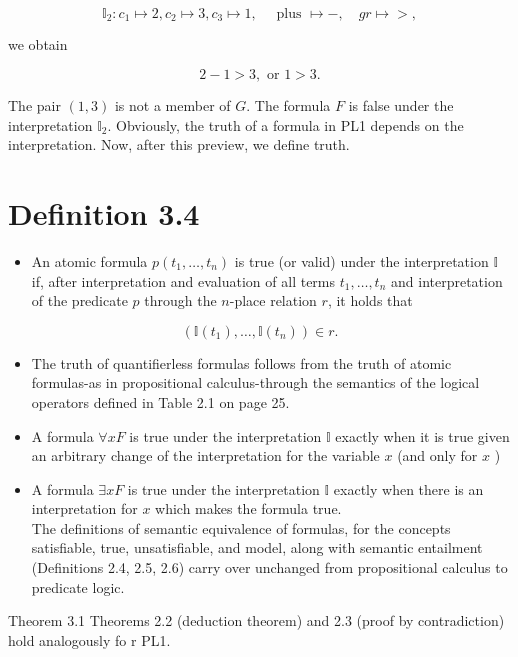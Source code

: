 \documentclass[10pt]{article}
\begin{document}
$$
\mathbb{I}_{2}: c_{1} \mapsto 2, c_{2} \mapsto 3, c_{3} \mapsto 1, \quad \text { plus } \mapsto-, \quad g r \mapsto>,
$$

we obtain

$$
2-1>3, \text { or } 1>3 .
$$

The pair $(1,3)$ is not a member of $G$. The formula $F$ is false under the interpretation $\mathbb{I}_{2}$. Obviously, the truth of a formula in PL1 depends on the interpretation. Now, after this preview, we define truth.

\section*{Definition 3.4}
\begin{itemize}
  \item An atomic formula $p\left(t_{1}, \ldots, t_{n}\right)$ is true (or valid) under the interpretation $\mathbb{I}$ if, after interpretation and evaluation of all terms $t_{1}, \ldots, t_{n}$ and interpretation of the predicate $p$ through the $n$-place relation $r$, it holds that
\end{itemize}

$$
\left(\mathbb{I}\left(t_{1}\right), \ldots, \mathbb{I}\left(t_{n}\right)\right) \in r .
$$

\begin{itemize}
  \item The truth of quantifierless formulas follows from the truth of atomic formulas-as in propositional calculus-through the semantics of the logical operators defined in Table 2.1 on page 25.
  \item A formula $\forall x F$ is true under the interpretation $\mathbb{I}$ exactly when it is true given an arbitrary change of the interpretation for the variable $x$ (and only for $x$ )
  \item A formula $\exists x F$ is true under the interpretation $\mathbb{I}$ exactly when there is an interpretation for $x$ which makes the formula true.\\
The definitions of semantic equivalence of formulas, for the concepts satisfiable, true, unsatisfiable, and model, along with semantic entailment (Definitions 2.4, 2.5, 2.6) carry over unchanged from propositional calculus to predicate logic.
\end{itemize}

Theorem 3.1 Theorems 2.2 (deduction theorem) and 2.3 (proof by contradiction) hold analogously fo
r PL1.
\end{document}
